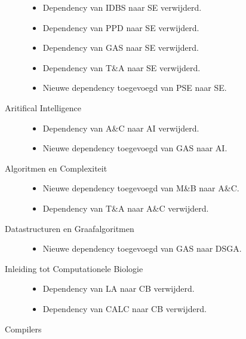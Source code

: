\documentclass[a4paper]{article}
\begin{document}
\begin{multicols*}{2}
\begin{description}
            \begin{itemize}
                    \item Dependency van IDBS naar SE verwijderd.
                    \item Dependency van PPD naar SE verwijderd.
                    \item Dependency van GAS naar SE verwijderd.
                    \item Dependency van T\&A naar SE verwijderd.
                    \item Nieuwe dependency toegevoegd van PSE naar SE.
            \end{itemize}
            \pagebreak[3]
            \item[Aritifical Intelligence] \hfill
            \begin{itemize}
                    \item Dependency van A\&C naar AI verwijderd.
                    \item Nieuwe dependency toegevoegd van GAS naar AI.
            \end{itemize}
            \pagebreak[3]
            \item[Algoritmen en Complexiteit] \hfill
            \begin{itemize}
                    \item Nieuwe dependency toegevoegd van M\&B naar A\&C.
                    \item Dependency van T\&A naar A\&C verwijderd.
            \end{itemize}
            \pagebreak[3]
            \item[Datastructuren en Graafalgoritmen] \hfill
            \begin{itemize}
                    \item Nieuwe dependency toegevoegd van GAS naar DSGA.
            \end{itemize}
            \pagebreak[3]
            \item[Inleiding tot Computationele Biologie] \hfill
            \begin{itemize}
                    \item Dependency van LA naar CB verwijderd.
                    \item Dependency van CALC naar CB verwijderd.
            \end{itemize}
            \pagebreak[3]
            \item[Compilers] \hfill
            \begin{itemize}

\end{itemize}
\end{description}
\end{multicols*}
\end{document}
